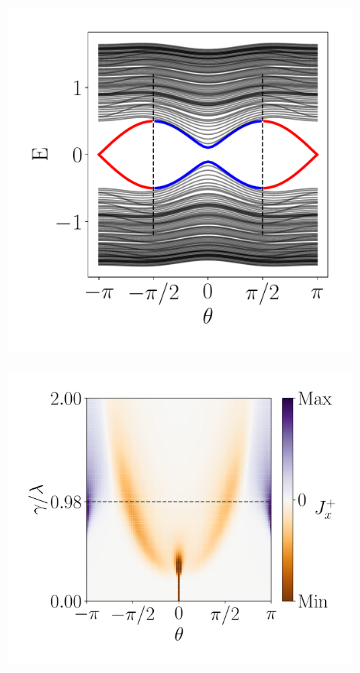 \begin{figure}[h!]
     \centering
    \captionsetup[sub]{font=small}
     \begin{minipage}[h!]{1\textwidth}
         \begin{subfigure}[b!]{0.3 \textwidth}
             \caption{}
             \includegraphics[width=\textwidth]{Imagenes/Resultados_pump_Cuadrado/y/param_pump_A=0.5y.pdf}
             \label{}
         \end{subfigure}\hspace*{-0.5em}
         \begin{subfigure}[b!]{0.35 \textwidth}
             \caption{}
             \includegraphics[width=\textwidth]{Imagenes/Resultados_pump_Cuadrado/y/current_square_pumpy.pdf}

\end{subfigure}
\end{minipage}
\end{figure}
